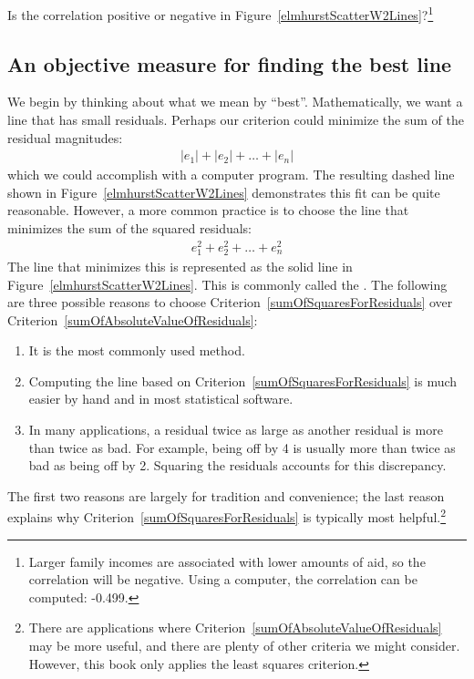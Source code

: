 \begin{exercise}
Is the correlation positive or negative in Figure~\ref{elmhurstScatterW2Lines}?\footnote{Larger family incomes are associated with lower amounts of aid, so the correlation will be negative. Using a computer, the correlation can be computed: -0.499.}
\end{exercise}

\subsection{An objective measure for finding the best line}

We begin by thinking about what we mean by ``best''. Mathematically, we want a line that has small residuals. Perhaps our criterion could minimize the sum of the residual magnitudes:
\begin{eqnarray}
|e_1| + |e_2| + \dots + |e_n|
\label{sumOfAbsoluteValueOfResiduals}
\end{eqnarray}
which we could accomplish with a computer program. The resulting dashed line shown in Figure~\ref{elmhurstScatterW2Lines} demonstrates this fit can be quite reasonable. However, a more common practice is to choose the line that minimizes the sum of the squared residuals:
\begin{eqnarray}
e_{1}^2 + e_{2}^2 + \dots + e_{n}^2
\label{sumOfSquaresForResiduals}
\end{eqnarray}
The line that minimizes this  is represented as the solid line in Figure~\ref{elmhurstScatterW2Lines}. This is commonly called the . The following are three possible reasons to choose Criterion~\eqref{sumOfSquaresForResiduals} over Criterion~\eqref{sumOfAbsoluteValueOfResiduals}:
\begin{enumerate}
\item It is the most commonly used method.
\item Computing the line based on Criterion~\eqref{sumOfSquaresForResiduals} is much easier by hand and in most statistical software.
\item In many applications, a residual twice as large as another residual is more than twice as bad. For example, being off by 4 is usually more than twice as bad as being off by 2. Squaring the residuals accounts for this discrepancy.
\end{enumerate}
The first two reasons are largely for tradition and convenience; the last reason explains why Criterion~\eqref{sumOfSquaresForResiduals} is typically most helpful.\footnote{There are applications where Criterion~\eqref{sumOfAbsoluteValueOfResiduals} may be more useful, and there are plenty of other criteria we might consider. However, this book only applies the least squares criterion.}

